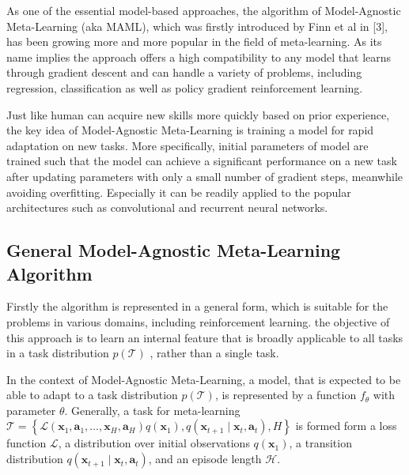 As one of the essential model-based approaches, the algorithm of Model-Agnostic Meta-Learning (aka MAML), which was firstly introduced by Finn et al in [3], has been growing more and more popular in the field of meta-learning. As its name implies the approach offers a high compatibility to any model that learns through gradient descent and can handle a variety of problems, including regression, classification as well as policy gradient reinforcement learning.

Just like human can acquire new skills more quickly based on prior experience, the key idea of Model-Agnostic Meta-Learning is training a model for rapid adaptation on new tasks. More specifically, initial parameters of model are trained such that the model can achieve a significant performance on a new task after updating parameters with only a small number of gradient steps, meanwhile avoiding overfitting. Especially it can be readily applied to the popular architectures such as convolutional and recurrent neural networks.

\subsection{ General Model-Agnostic Meta-Learning Algorithm}
Firstly the algorithm is represented in a general form, which is suitable for the problems in various domains, including reinforcement learning. the objective of this approach is to learn an internal feature that is broadly applicable to all tasks in a task distribution $p(\mathcal{T})$
, rather than a single task.

In the context of Model-Agnostic Meta-Learning, a model, that is expected to be able to adapt to a task distribution $p(\mathcal{T})$, is represented by a function $f_{\theta}$ with parameter $\theta$. Generally, a task for meta-learning 
$\mathcal{T}=\left\{\mathcal{L}\left(\mathbf{x}_{1}, \mathbf{a}_{1}, \ldots, \mathbf{x}_{H}, \mathbf{a}_{H}\right) q\left(\mathbf{x}_{1}\right), q\left(\mathbf{x}_{t+1} \mid \mathbf{x}_{t}, \mathbf{a}_{t}\right), H\right\}$ is formed form a loss function $\mathcal{L}$, a distribution over initial observations $q\left(\mathbf{x}_{1}\right)$, a transition distribution $q\left(\mathbf{x}_{t+1} \mid \mathbf{x}_{t}, \mathbf{a}_{t}\right)$, and
an episode length $\mathcal{H}$.

